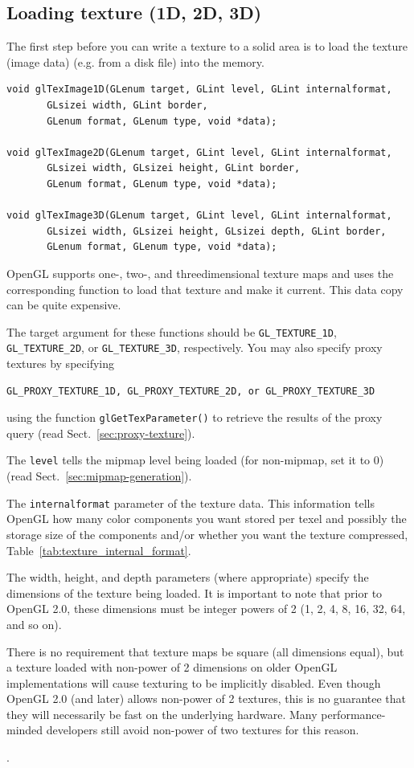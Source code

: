 \subsection{Loading texture (1D, 2D, 3D)}
\label{sec:loading-texture}

The first step before you can write a texture to a solid area is to
load the texture (image data) (e.g. from a disk file) into the memory.
\begin{verbatim}
void glTexImage1D(GLenum target, GLint level, GLint internalformat,
       GLsizei width, GLint border,
       GLenum format, GLenum type, void *data);

void glTexImage2D(GLenum target, GLint level, GLint internalformat,
       GLsizei width, GLsizei height, GLint border,
       GLenum format, GLenum type, void *data);

void glTexImage3D(GLenum target, GLint level, GLint internalformat,
       GLsizei width, GLsizei height, GLsizei depth, GLint border,
       GLenum format, GLenum type, void *data);
\end{verbatim}
OpenGL supports one-, two-, and threedimensional texture maps and uses
the corresponding function to load that texture and make it
current. This data copy can be quite expensive.

The target argument for these functions should be
\verb!GL_TEXTURE_1D!, \verb!GL_TEXTURE_2D!, or \verb!GL_TEXTURE_3D!,
respectively. You may also specify proxy textures by specifying
\begin{verbatim}
GL_PROXY_TEXTURE_1D, GL_PROXY_TEXTURE_2D, or GL_PROXY_TEXTURE_3D 
\end{verbatim}
using the function \verb!glGetTexParameter()! to retrieve the results
of the proxy query (read Sect.~\ref{sec:proxy-texture}). 

The \verb!level! tells the mipmap level being loaded (for non-mipmap,
set it to 0) (read Sect.~\ref{sec:mipmap-generation}).

The \verb!internalformat! parameter of the texture data. This
information tells OpenGL how many color components you want stored per
texel and possibly the storage size of the components and/or whether
you want the texture compressed,
Table~\ref{tab:texture_internal_format}.

\begin{framed}
  The width, height, and depth parameters (where appropriate) specify
  the dimensions of the texture being loaded. It is important to note
  that prior to OpenGL 2.0, these dimensions must be integer powers of
  2 (1, 2, 4, 8, 16, 32, 64, and so on). 

  There is no requirement that texture maps be square (all dimensions
  equal), but a texture loaded with non-power of 2 dimensions on older
  OpenGL implementations will cause texturing to be implicitly
  disabled. Even though OpenGL 2.0 (and later) allows non-power of 2
  textures, this is no guarantee that they will necessarily be fast on
  the underlying hardware. Many performance-minded developers still
  avoid non-power of two textures for this reason.
\end{framed}
.

